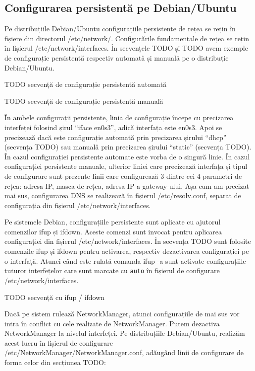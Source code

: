 \subsection{Configurarea persistentă pe Debian/Ubuntu}
\label{sec:net:persistent-config-debian}

Pe distribuțiile Debian/Ubuntu configurațiile persistente de rețea se rețin în fișiere din directorul /etc/network/. Configurările fundamentale de rețea se rețin în fișierul /etc/network/interfaces. În secvențele TODO și TODO avem exemple de configurație persistentă respectiv automată și manuală pe o distribuție Debian/Ubuntu.

TODO secvență de configurație persistentă automată

TODO secvență de configurație persistentă manuală

În ambele configurații persistente, linia de configurație începe cu precizarea interfeței folosind șirul “iface en0s3”, adică interfața este en0s3. Apoi se precizează dacă este configurație automată prin precizarea șirului “dhcp” (secvența TODO) sau manuală prin precizarea șirului “static” (secvența TODO). În cazul configurației persistente automate este vorba de o singură linie. În cazul configurației persistente manuale, ulterior liniei care precizează interfața și tipul de configurare sunt prezente linii care configurează 3 dintre cei 4 parametri de rețea: adresa IP, masca de rețea, adresa IP a gateway-ului. Așa cum am precizat mai sus, configurarea DNS se realizează în fișierul /etc/resolv.conf, separat de configurația din fișierul /etc/network/interfaces.

Pe sistemele Debian, configurațiile persistente sunt aplicate cu ajutorul comenzilor ifup și ifdown. Aceste comenzi sunt invocat pentru aplicarea configurației din fișierul /etc/network/interfaces. În secvența TODO sunt folosite comenzile ifup și ifdown pentru activarea, respectiv dezactivarea configurației pe o interfață. Atunci când este rulată comanda ifup -a sunt activate configurațiile tuturor interfețelor care sunt marcate cu \texttt{auto} în fișierul de configurare /etc/network/interfaces.

TODO secvență cu ifup / ifdown

Dacă pe sistem rulează NetworkManager, atunci configurațiile de mai sus vor intra în conflict cu cele realizate de NetworkManager. Putem dezactiva NetworkManager la nivelul interfeței. Pe distribuțiile Debian/Ubuntu, realizăm acest lucru în fișierul de configurare /etc/NetworkManager/NetworkManager.conf, adăugând linii de configurare de forma celor din secțiunea TODO:


